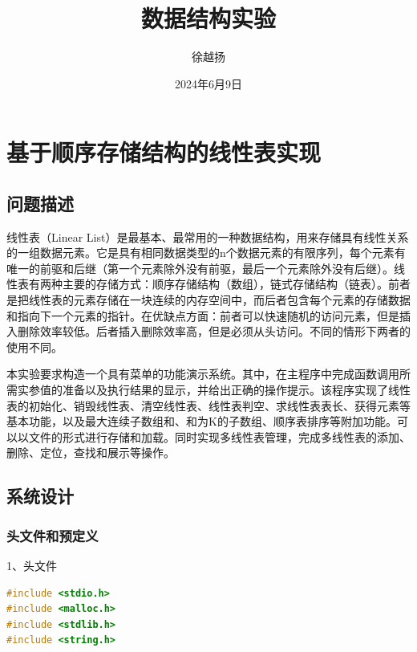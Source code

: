 \documentclass[supercite]{Experimental_Report}
\title{~~~~~~数据结构实验~~~~~~}
\author{徐越扬}
\date{2024年6月9日}
\theoremstyle{definition}
\begin{document}
\maketitle

\clearpage


\tableofcontents[level=2]

\clearpage


\section{基于顺序存储结构的线性表实现}

\subsection{问题描述}

线性表（Linear List）是最基本、最常用的一种数据结构，用来存储具有线性关系的一组数据元素。它是具有相同数据类型的n个数据元素的有限序列，每个元素有唯一的前驱和后继（第一个元素除外没有前驱，最后一个元素除外没有后继）。线性表有两种主要的存储方式：顺序存储结构（数组），链式存储结构（链表）。前者是把线性表的元素存储在一块连续的内存空间中，而后者包含每个元素的存储数据和指向下一个元素的指针。在优缺点方面：前者可以快速随机的访问元素，但是插入删除效率较低。后者插入删除效率高，但是必须从头访问。不同的情形下两者的使用不同。

本实验要求构造一个具有菜单的功能演示系统。其中，在主程序中完成函数调用所需实参值的准备以及执行结果的显示，并给出正确的操作提示。该程序实现了线性表的初始化、销毁线性表、清空线性表、线性表判空、求线性表表长、获得元素等基本功能，以及最大连续子数组和、和为K的子数组、顺序表排序等附加功能。可以以文件的形式进行存储和加载。同时实现多线性表管理，完成多线性表的添加、删除、定位，查找和展示等操作。

\subsection{系统设计}

\subsubsection{头文件和预定义}

1、头文件

\begin{lstlisting}[language=c]
#include <stdio.h>
#include <malloc.h>
#include <stdlib.h>
#include <string.h>
\end{lstlisting}
\end{document}
